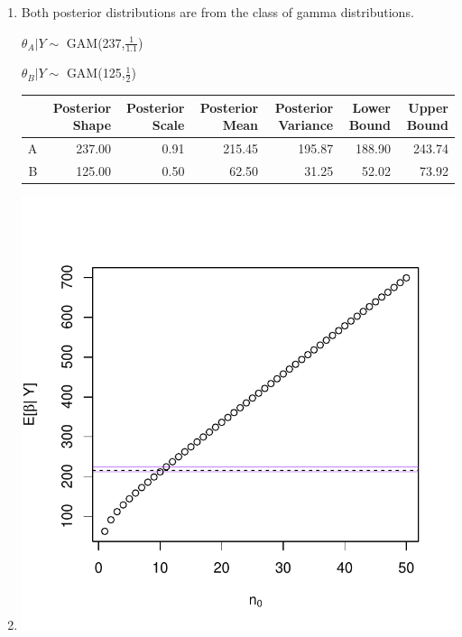 \documentclass{article}\usepackage[]{graphicx}\usepackage[]{color}
\makeatletter
\def\maxwidth{ %
  \ifdim\Gin@nat@width>\linewidth
    \linewidth
  \else
    \Gin@nat@width
  \fi
}
\newenvironment{knitrout}{}{} %
\makeatother
\begin{document}
\begin{enumerate}
\begin{enumerate}

\item%

Both posterior distributions are from the class of gamma distributions.

$\theta_{A} \vert Y \sim$ GAM(237,$\frac{1}{1.1}$)

$\theta_{B} \vert Y \sim$ GAM(125,$\frac{1}{2}$)


\begin{table}[htb!]
\centering
\begin{tabular}{rrrrrrr}
  \hline
 & Posterior Shape & Posterior Scale & Posterior Mean & Posterior Variance & Lower Bound & Upper Bound \\ 
  \hline
A & 237.00 & 0.91 & 215.45 & 195.87 & 188.90 & 243.74 \\ 
  B & 125.00 & 0.50 & 62.50 & 31.25 & 52.02 & 73.92 \\ 
   \hline
\end{tabular}
\end{table}


\newpage

\item%


\begin{knitrout}
\color{fgcolor}
\includegraphics[width=\maxwidth]{figure/prob3b-1} 


\end{knitrout}
\end{enumerate}
\end{enumerate}
\end{document}
